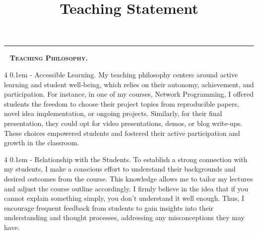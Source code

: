 \documentclass[9pt]{article}
\title{
\vspace{-3em}
\textbf{Teaching Statement} \hfill \href{https://ksolaiman.github.io/}{\textit{\Name}}
\vspace{-2.5em}
}
\date{}
\makeatletter
\def \paragraph {%
    \@startsection{paragraph}%
        {4}%
        \z@%
        {0.1em}
        {-\fontdimen 6 \font}%
        {\normalfont \bfseries}%
    }
\makeatother
\begin{document}
\pagestyle{plain}

\noindent\rule{2cm}{4pt}~\textbf{\textsc{ Teaching Philosophy.}}

\paragraph{Accessible Learning.} 
My teaching philosophy centers around active learning and student well-being, which relies on their autonomy, achievement, and participation. For instance, in one of my courses, Network Programming, I offered students the freedom to choose their project topics from reproducible papers, novel idea implementation, or ongoing projects. Similarly, for their final presentation, they could opt for video presentations, demos, or blog write-ups. These choices empowered students and fostered their active participation and growth in the classroom.

\paragraph{Relationship with the Students.}
To establish a strong connection with my students, I make a conscious effort to understand their backgrounds and desired outcomes from the course. This knowledge allows me to tailor my lectures and adjust the course outline accordingly. I firmly believe in the idea that if you cannot explain something simply, you don't understand it well enough. Thus, I encourage frequent feedback from students to gain insights into their understanding and thought processes, addressing any misconceptions they may have.
\end{document}
